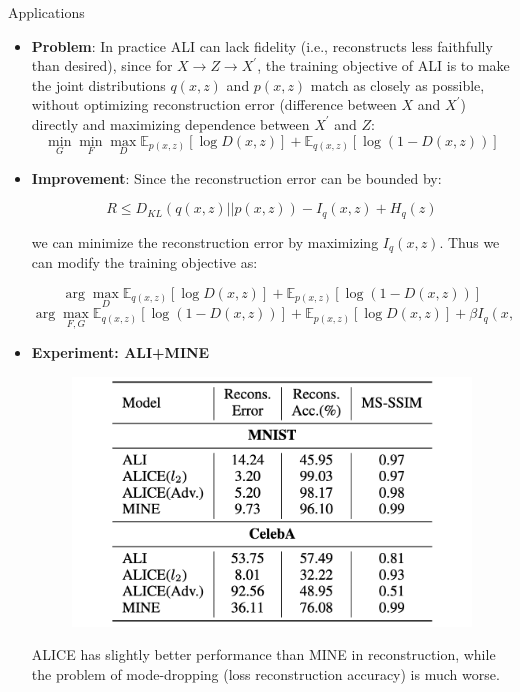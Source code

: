 \documentclass[final]{beamer}
\newlength{\colwidth}
\begin{document}
\begin{frame}[t]
\begin{columns}[t]
\begin{column}{\colwidth}
\begin{block}{Applications}
\begin{itemize}
\end{itemize}

\begin{itemize}
    \item \textbf{Problem}: In practice ALI can lack fidelity (i.e., reconstructs less faithfully than desired), since for $X \to Z \to X^{\prime}$, the training objective of ALI is to make the joint distributions $q(x, z)$ and $p(x, z)$ match as closely as possible, without optimizing reconstruction error (difference between $X$ and $X^{\prime}$) directly and maximizing dependence between $X^{\prime}$ and $Z$:
    $$\min_G \min_F \max_D \mathbb{E}_{p(x, z)}[\log D(x, z)] + \mathbb{E}_{q(x, z)}[\log(1 - D(x, z))]$$

    \item \textbf{Improvement}: Since the reconstruction error can be bounded by:
    
    $$
    R \leq D_{KL}(q(x, z) || p(x, z)) - I_q(x, z) + H_q(z)
    $$
    
    we can minimize the reconstruction error by maximizing $I_q(x, z)$. Thus we can modify the training objective as:
    
    $$
    \arg \max_D \mathbb{E}_{q(x,z)}[\log D(x, z)] + \mathbb{E}_{p(x,z)}[\log (1 - D(x, z))]
    $$
    $$
    \arg \max_{F, G} \mathbb{E}_{q(x,z)}[\log (1 - D(x, z))] + \mathbb{E}_{p(x,z)}[\log D(x, z)] + \beta I_q(x, z)
    $$

    \item \textbf{Experiment: ALI+MINE}
    \begin{figure}
        \centering
        \includegraphics[width=0.75\linewidth]{figures/截屏2024-12-31 11.18.57.png}
    \end{figure}
    
    ALICE has slightly better performance than MINE in reconstruction, while the problem of mode-dropping (loss reconstruction accuracy) is much worse.
    

\end{itemize}
\end{block}
\end{column}
\end{columns}
\end{frame}
\end{document}
